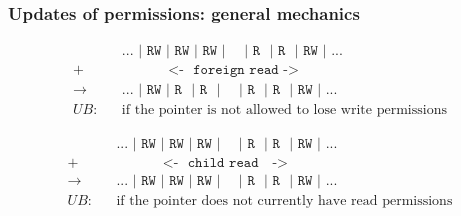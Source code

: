 \begin{frame}
    \frametitle{Updates of permissions: general mechanics}
    \begin{block}{}
        \begin{align*}
                && \texttt{... | RW | RW | RW | ~~ | R~ | R~ | RW | ...} \\
              + && \texttt{~~~~~~~~~~<-~ foreign read ->~~~~~~~~~~~~~~~} \\
            \to && \texttt{... | RW | R~ | R~ | ~~ | R~ | R~ | RW | ...} \\
            UB: && \text{if the pointer is not allowed to lose write permissions}
        \end{align*}
    \end{block}
    \begin{block}{}
        \begin{align*}
                && \texttt{... | RW | RW | RW | ~~ | R~ | R~ | RW | ...} \\
              + && \texttt{~~~~~~~~~~<-~ child read ~~->~~~~~~~~~~~~~~~} \\
            \to && \texttt{... | RW | RW | RW | ~~ | R~ | R~ | RW | ...} \\
            UB: && \text{if the pointer does not currently have read permissions}
        \end{align*}
    \end{block}
\end{frame}

